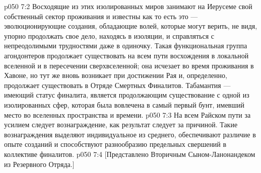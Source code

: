 \vs p050 7:2 Восходящие из этих изолированных миров занимают на Иерусеме свой собственный сектор проживания и известны как  то есть это --- эволюционирующие создания, обладающие волей, которые могут верить, не видя, упорно продолжать свое дело, находясь в изоляции, и справляться с непреодолимыми трудностями даже в одиночку. Такая функциональная группа агондонтеров продолжает существовать на всем пути восхождения в локальной вселенной и в пересечении сверхвселенной; она исчезает во время проживания в Хавоне, но тут же вновь возникает при достижении Рая и, определенно, продолжает существовать в Отряде Смертных Финалитов. Табамантия ---  имеющий статус финалита, является продолжающим существование с одной из изолированных сфер, которая была вовлечена в самый первый бунт, имевший место во вселенных пространства и времени.
\vs p050 7:3 На всем Райском пути за усилием следует вознаграждение, как результат следует за причиной. Такие вознаграждения выделяют индивидуальное из среднего, обеспечивают различие в опыте созданий и способствуют разнообразию предельных свершений в коллективе финалитов.
\vsetoff
\vs p050 7:4 [Представлено Вторичным Сыном\hyp{}Ланонандеком из Резервного Отряда.]
